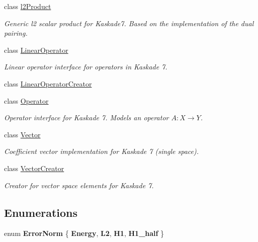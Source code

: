 \begin{DoxyCompactItemize}
class \hyperlink{classSpacy_1_1Kaskade_1_1l2Product}{l2\+Product}
\begin{DoxyCompactList}\small\item\em Generic l2 scalar product for Kaskade7. Based on the implementation of the dual pairing. \end{DoxyCompactList}\item 
class \hyperlink{classSpacy_1_1Kaskade_1_1LinearOperator}{Linear\+Operator}
\begin{DoxyCompactList}\small\item\em Linear operator interface for operators in Kaskade 7. \end{DoxyCompactList}\item 
class \hyperlink{classSpacy_1_1Kaskade_1_1LinearOperatorCreator}{Linear\+Operator\+Creator}
\item 
class \hyperlink{classSpacy_1_1Kaskade_1_1Operator}{Operator}
\begin{DoxyCompactList}\small\item\em Operator interface for Kaskade 7. Models an operator $A:X\rightarrow Y$. \end{DoxyCompactList}\item 
class \hyperlink{classSpacy_1_1Kaskade_1_1Vector}{Vector}
\begin{DoxyCompactList}\small\item\em Coefficient vector implementation for Kaskade 7 (single space). \end{DoxyCompactList}\item 
class \hyperlink{classSpacy_1_1Kaskade_1_1VectorCreator}{Vector\+Creator}
\begin{DoxyCompactList}\small\item\em Creator for vector space elements for Kaskade 7. \end{DoxyCompactList}\end{DoxyCompactItemize}
\subsection*{Enumerations}
\begin{DoxyCompactItemize}
\item 
\hypertarget{namespaceSpacy_1_1Kaskade_a23b44f27b9b34f6c27bdcfb79b4eaee3}{}enum {\bfseries Error\+Norm} \{ {\bfseries Energy}, 
{\bfseries L2}, 
{\bfseries H1}, 
{\bfseries H1\+\_\+half}
 \}\label{namespaceSpacy_1_1Kaskade_a23b44f27b9b34f6c27bdcfb79b4eaee3}

\end{DoxyCompactItemize}
